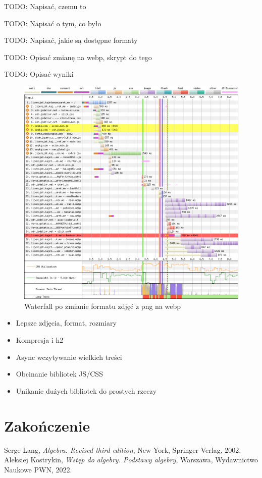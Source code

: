 \documentclass[licencjacka]{pracadypl}
\begin{document}
TODO: Napisać, czemu to

TODO: Napisać o tym, co było

TODO: Napisać, jakie są dostępne formaty

TODO: Opisać zmianę na webp, skrypt do tego

TODO: Opisać wyniki

\begin{figure}[H]
  \includegraphics[width=\linewidth]{images/waterfall-after-webp.png}
  \caption{Waterfall po zmianie formatu zdjęć z png na webp}
  \label{fig:waterfall-after-webp}
\end{figure}



\vspace{5em}

\begin{itemize}
  \item Lepsze zdjęcia, format, rozmiary
  \item Kompresja i h2
  \item Async wczytywanie wielkich treści
  \item Obcinanie bibliotek JS/CSS
  \item Unikanie dużych bibliotek do prostych rzeczy
\end{itemize}


\chapter{Zakończenie}


\begin{thebibliography}{7}
%
Serge Lang, 
\textit{Algebra. Revised third edition}, 
New York, Springer-Verlag, 2002.
%
Aleksiej Kostrykin, 
\textit{Wstęp do algebry. Podstawy algebry},
Warszawa, Wydawnictwo Naukowe PWN, 2022.
\end{thebibliography}
\end{document}
